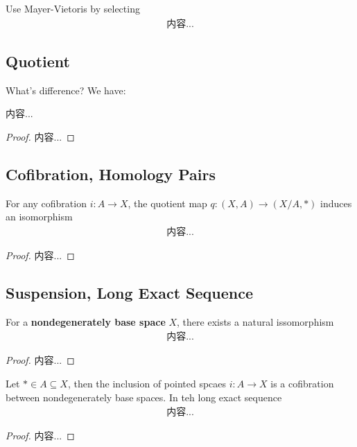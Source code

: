 \documentclass[Total.tex]{subfiles}
\begin{document}
			Use Mayer-Vietoris by selecting
			\begin{gather*}
				内容...
			\end{gather*}
			\subsection{Quotient}
			
			
			What's difference? We have:
			\begin{proposition}
				内容...
			\end{proposition}
			\begin{proof}
				内容...
			\end{proof}
			\subsection{Cofibration, Homology Pairs}
			\begin{theorem}
				For any cofibration $i:A\rightarrow X$, the quotient map $q:(X,A)\rightarrow (X/A,*)$ induces an isomorphism
				\begin{gather*}
					内容...
				\end{gather*}
			\end{theorem}
			\begin{proof}
				内容...
			\end{proof}
			\subsection{Suspension, Long Exact Sequence}
			
			\begin{theorem}
				For a \textbf{nondegenerately base space} $X$, there exists a natural issomorphism
				\begin{gather*}
					内容...
				\end{gather*}
			\end{theorem}
			\begin{proof}
				内容...
			\end{proof}
			
			\begin{corollary}
				Let $*\in A\subseteq X$, then the inclusion of pointed spcaes $i:A\rightarrow X$ is a cofibration between nondegenerately base spaces. In teh long exact sequence
				\begin{gather*}
					内容...
				\end{gather*}
			\end{corollary}
			\begin{proof}
				内容...
			\end{proof}
			
\end{document}
